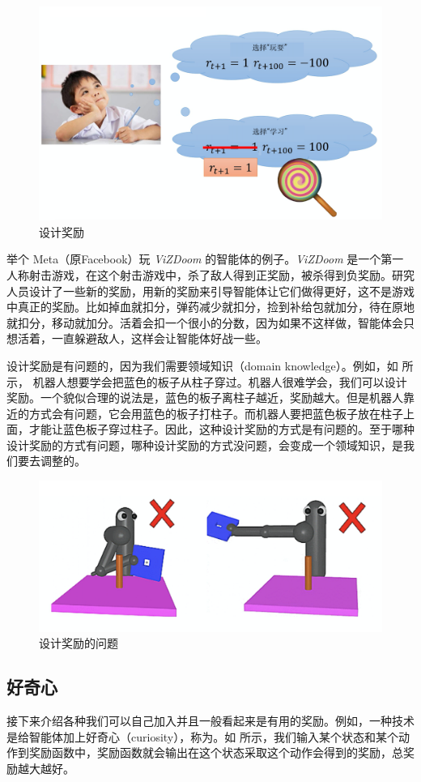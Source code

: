 \begin{figure}[htb]
    \centering
    \includegraphics[width=0.5\linewidth]{res/ch10/10.1}
    \caption{设计奖励}
    \label{fig:fig10.1}
\end{figure}

举个 Meta（原Facebook）玩 \textit{ViZDoom} 的智能体的例子。\textit{ViZDoom} 是一个第一人称射击游戏，在这个射击游戏中，杀了敌人得到正奖励，被杀得到负奖励。研究人员设计了一些新的奖励，用新的奖励来引导智能体让它们做得更好，这不是游戏中真正的奖励。比如掉血就扣分，弹药减少就扣分，捡到补给包就加分，待在原地就扣分，移动就加分。活着会扣一个很小的分数，因为如果不这样做，智能体会只想活着，一直躲避敌人，这样会让智能体好战一些。

设计奖励是有问题的，因为我们需要领域知识（domain knowledge）。例如，如 所示，
机器人想要学会把蓝色的板子从柱子穿过。机器人很难学会，我们可以设计奖励。一个貌似合理的说法是，蓝色的板子离柱子越近，奖励越大。但是机器人靠近的方式会有问题，它会用蓝色的板子打柱子。而机器人要把蓝色板子放在柱子上面，才能让蓝色板子穿过柱子。因此，这种设计奖励的方式是有问题的。至于哪种设计奖励的方式有问题，哪种设计奖励的方式没问题，会变成一个领域知识，是我们要去调整的。

\begin{figure}[htb]
    \centering
    \includegraphics[width=0.5\linewidth]{res/ch10/10.2}
    \caption{设计奖励的问题}
    \label{fig:fig10.2}
\end{figure}

\subsection{好奇心}  

接下来介绍各种我们可以自己加入并且一般看起来是有用的奖励。例如，一种技术是给智能体加上好奇心（curiosity），称为。如 所示，我们输入某个状态和某个动作到奖励函数中，奖励函数就会输出在这个状态采取这个动作会得到的奖励，总奖励越大越好。

